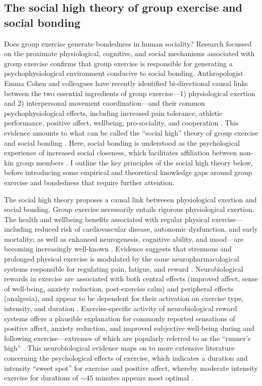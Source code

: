 \begin{CJK}{UTF8}{gbsn}
\subsection{The social high theory of group exercise and social bonding \label{sect:socialHigh}}

Does group exercise generate bondedness in human sociality?  Research focussed on the proximate physiological, cognitive, and social mechanisms associated with group exercise confirms that group exercise is responsible for generating a psychophysiological environment conducive to social bonding.  Anthropologist Emma Cohen and colleagues have recently identified bi-directional causal links between the two essential ingredients of group exercise---1) physiological exertion and 2) interpersonal movement coordination---and their common psychophysiological effects, including increased pain tolerance, athletic performance, positive affect, wellbeing, pro-sociality, and cooperation \citep{Davis2015}.  This evidence amounts to what can be called the ``social high'' theory of group exercise and social bonding \citep[hereafter ``the social high theory,'' see][]{Cohen2017}. Here, social bonding is understood as the psychological experience of increased social closeness, which facilitates affiliation between non-kin group members \citep{Tarr2014}.  I outline the key principles of the social high theory below, before introducing some empirical and theoretical knowledge gaps around group exercise and bondedness that require further attention.

The social high theory proposes a causal link betweeen physiological exertion and social bonding.  Group exercise necessarily entails rigorous physiological exertion.
The health and wellbeing benefits associated with regular physical exercise---including reduced risk of cardiovascular disease, autonomic dysfunction, and early mortality; as well as enhanced neurogenesis, cognitive ability, and mood---are becoming increasingly well-known \citep{Blair1994,Nagamatsu2014}. Evidence suggests that strenuous and prolonged physical exercise is modulated by the same neuropharmacological systems responsible for regulating pain, fatigue, and reward \citep{Boecker2008,Raichlen2013}.  Neurobiological rewards in exercise are associated with both central effects (improved affect, sense of well-being, anxiety reduction, post-exercise calm) and peripheral effects (analgesia), and appear to be dependent for their activation on exercise type, intensity, and duration \citep{Dietrich2004}.  Exercise-specific activity of neurobiological reward systems offers a plausible explanation for commonly reported sensations of positive affect, anxiety reduction, and improved subjective well-being during and following exercise---extremes of which are popularly referred to as the ``runner's high'' \citep{Dietrich2004,Boecker2008,Raichlen2012}.  This neurobiological evidence maps on to more extensive literature concerning the psychological effects of exercise, which indicates a duration and intensity ``sweet spot'' for exercise and positive affect, whereby moderate intensity exercise for durations of $\sim45$ minutes appears most optimal \citep{Reed2006}.


\end{CJK}

